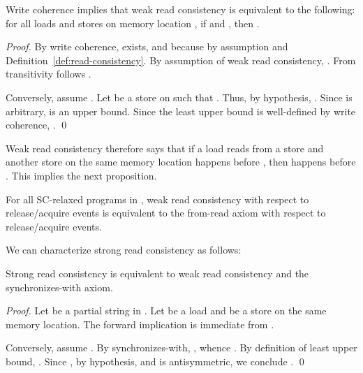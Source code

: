 \documentclass{llncs}
\begin{document}
\begin{proposition}
\label{proposition:read-consistency-characterization}
Write coherence implies that weak read consistency is equivalent to the following: for all loads  and stores  on memory location , if  and , then .
\end{proposition}
\begin{proof}
By write coherence,  exists, and  because  by assumption  and Definition~\ref{def:read-consistency}. By assumption of weak read consistency, . From transitivity follows .

Conversely, assume . Let  be a store on  such that . Thus, by hypothesis, . Since  is arbitrary,  is an upper bound. Since the least upper bound is well-defined by write coherence, . \qed
\end{proof}

Weak read consistency therefore says that if a load  reads from a store  and another store  on the same memory location happens before , then  happens before . This implies the next proposition. 

\begin{proposition}
\label{proposition:read-consistency-equivalence}
For all SC-relaxed programs in , weak read consistency with respect to release/acquire events is equivalent to the from-read axiom with respect to release/acquire events.
\end{proposition}


We can characterize strong read consistency as follows:

\begin{proposition}
\label{proposition:strong-read-consistency-equivalence}
Strong read consistency is equivalent to weak read consistency and the synchronizes-with axiom.
\end{proposition}
\begin{proof}
Let  be a partial string in . Let  be a load and  be a store on the same memory location. The forward implication is immediate from .

Conversely, assume . By synchronizes-with, , whence . By definition of least upper bound, . Since , by hypothesis, and  is antisymmetric, we conclude . \qed
\end{proof}
\end{document}
